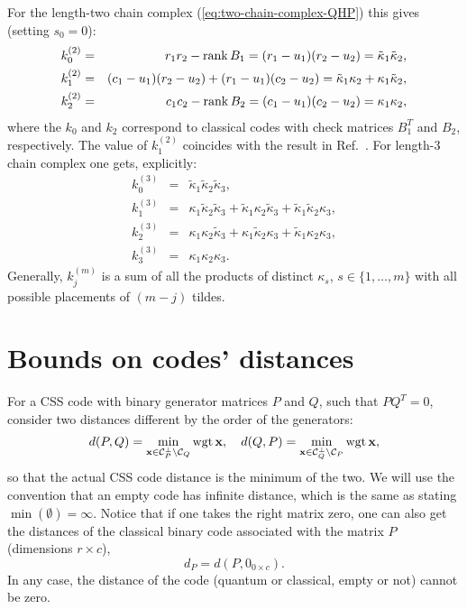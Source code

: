 \documentclass[aps,prb,12pt,tightenlines,%
notitlepage,longbibliography]{revtex4-1}
\begin{document}
For the length-two chain complex (\ref{eq:two-chain-complex-QHP}) this
gives (setting $s_{0}=0$): 
\begin{eqnarray}
  k_0^{(2)}&=&r_1r_2-\mathop{\rm rank}
               B_1=(r_1-u_1)(r_2-u_2)=\tilde{\kappa}_1\tilde{\kappa}_2,\\ 
  k_1^{(2)}&=&(c_1-u_1)(r_2-u_2)+(r_1-u_1)(c_2-u_2)=\tilde{\kappa}_1\kappa_2+\kappa_1\tilde{\kappa}_2,\label{eq:k-two}
  \\
  k_2^{(2)}&=&c_1c_2-\mathop{\rm rank} B_2=(c_1-u_1)(c_2-u_2)=\kappa_1\kappa_2,
\end{eqnarray}
where the $k_0$ and $k_2$ correspond to classical codes with check
matrices $B_1^T$ and $B_2$, respectively.  The value of $k_1^{(2)}$
coincides with the result in Ref.~.
For length-3 chain complex one gets, explicitly:
\begin{eqnarray*}
  k_0^{(3)}&=&\tilde{\kappa}_1\tilde{\kappa}_2\tilde{\kappa}_3,\\
  k_1^{(3)}&=&{\kappa}_1\tilde{\kappa}_2\tilde{\kappa}_3+\tilde{\kappa}_1{\kappa}_2\tilde{\kappa}_3+\tilde{\kappa}_1\tilde{\kappa}_2{\kappa}_3,\\
  k_2^{(3)}&=&{\kappa}_1{\kappa}_2\tilde{\kappa}_3+{\kappa}_1\tilde{\kappa}_2{\kappa}_3+\tilde{\kappa}_1{\kappa}_2{\kappa}_3,\\
  k_3^{(3)}&=&{\kappa}_1{\kappa}_2{\kappa}_3.
\end{eqnarray*}
Generally, $k_j^{(m)}$ is a sum of all the products of distinct
$\kappa_s$, $s\in\{1,\ldots,m\}$ with all possible placements of
$(m-j)$ tildes.

\section{Bounds on codes' distances}

For a CSS code with binary generator matrices $P$ and $Q$, such that
$PQ^T=0$, consider two distances different by the order of the
generators:
$$
 d(P,Q)=\min_{\mathbf{x}\in {\cal C}_{P}^\perp\setminus {\cal
     C}_{Q}} \mathop{\rm wgt} \mathbf{x},\quad 
 d(Q,P)=\min_{\mathbf{x}\in {\cal C}_{Q}^\perp\setminus {\cal
     C}_{P}} \mathop{\rm wgt} \mathbf{x},
$$
so that the actual CSS code distance is the minimum of the two.  We
will use the convention\cite{Tillich-Zemor-2009} that an empty code
has infinite distance, which is the same as stating
$\min(\emptyset)=\infty$.  Notice that if one takes the right matrix
zero, one can also get the distances of the classical binary code
associated with the matrix $P$ (dimensions $r\times c$),
$$
d_P=d(P,0_{0\times c}).
$$ 
In any case, the distance of the code (quantum or classical, empty or
not) cannot be zero.
\end{document}

